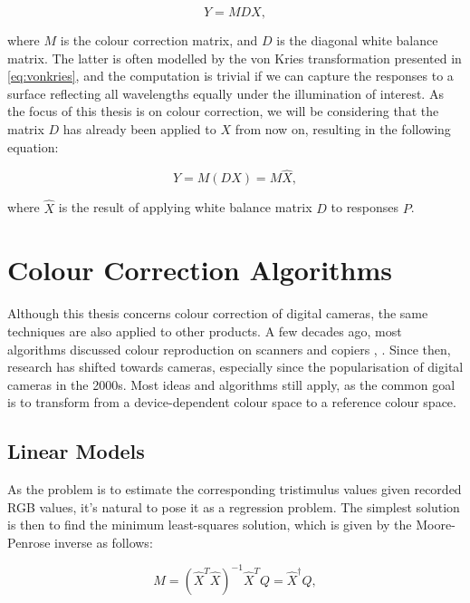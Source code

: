 \begin{equation}
    Y = MDX,
\end{equation}

where $M$ is the colour correction matrix, and $D$ is the diagonal white balance matrix. The latter is often modelled by the von Kries transformation presented in \ref{eq:vonkries}, and the computation is trivial if we can capture the responses to a surface reflecting all wavelengths equally under the illumination of interest. As the focus of this thesis is on colour correction, we will be considering that the matrix $D$ has already been applied to $X$ from now on, resulting in the following equation:

\begin{equation}
    Y = M(DX) = M\hat{X},
\end{equation}

where $\hat{X}$ is the result of applying white balance matrix $D$ to responses $P$.

\section{Colour Correction Algorithms}

Although this thesis concerns colour correction of digital cameras, the same techniques are also applied to other products. A few decades ago, most algorithms discussed colour reproduction on scanners and copiers \cite{vrhel1992color}, \cite{finlayson1997constrained}. Since then, research has shifted towards cameras, especially since the popularisation of digital cameras in the 2000s. Most ideas and algorithms still apply, as the common goal is to transform from a device-dependent colour space to a reference colour space.

\subsection{Linear Models}

As the problem is to estimate the corresponding tristimulus values given recorded RGB values, it's natural to pose it as a regression problem. The simplest solution is then to find the minimum least-squares solution, which is given by the Moore-Penrose inverse \cite{penrose1955generalized} as follows:

\begin{equation}
    M = (\hat{X}^T\hat{X})^{-1}\hat{X}^TQ=\hat{X}^{\dag}Q,
\end{equation}

